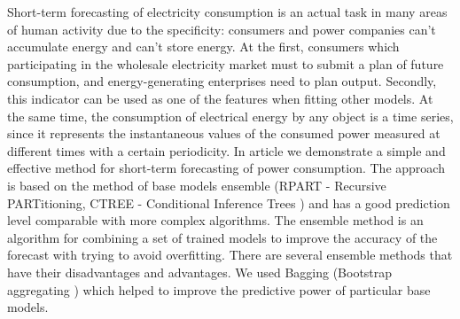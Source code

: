 \documentclass[60x84/16,8pt]{ittmm}
\begin{document}





\begin{altabstract}
Short-term forecasting of electricity consumption is an actual task in many
areas of human activity due to the specificity: consumers and power companies
can't accumulate energy and can't store energy. At the first, consumers which
participating in the wholesale electricity market must to submit a plan of
future consumption, and energy-generating enterprises need to plan output.
Secondly, this indicator can be used as one of the features when fitting other
models. At the same time, the consumption of electrical energy by any object is
a time series, since it represents the instantaneous values ​​of the consumed
power measured at different times with a certain periodicity. In article we
demonstrate a simple and effective method for short-term forecasting of power
consumption. The approach is based on the method of base models ensemble (RPART
- Recursive PARTitioning, CTREE - Conditional Inference Trees
\cite{BreimanEtAl}) and has a good prediction level comparable with more complex
algorithms. The ensemble method is an algorithm for combining a set of trained
models to improve the accuracy of the forecast with trying to avoid overfitting.
There are several ensemble methods that have their disadvantages and advantages.
We used Bagging (Bootstrap aggregating \cite{Breiman1996}) which helped to
improve the predictive power of particular base models.
\end{altabstract}
\end{document}
